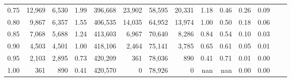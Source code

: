 \begin{tabular}{rrrrrrrrrrrrrr}
0.75 &  12,969 &  6,530 &    1.99 &  396,668 &   23,902 &  58,595 &  20,331 &  1.18 &  0.46 &  0.26 &      0.09 \\
0.80 &   9,867 &  6,357 &    1.55 &  406,535 &   14,035 &  64,952 &  13,974 &  1.00 &  0.50 &  0.18 &      0.06 \\
0.85 &   7,068 &  5,688 &    1.24 &  413,603 &    6,967 &  70,640 &   8,286 &  0.84 &  0.54 &  0.10 &      0.03 \\
0.90 &   4,503 &  4,501 &    1.00 &  418,106 &    2,464 &  75,141 &   3,785 &  0.65 &  0.61 &  0.05 &      0.01 \\
0.95 &   2,103 &  2,895 &    0.73 &  420,209 &      361 &  78,036 &     890 &  0.41 &  0.71 &  0.01 &      0.00 \\
1.00 &     361 &    890 &    0.41 &  420,570 &        0 &  78,926 &       0 &   nan &   nan &  0.00 &      0.00 \\
\bottomrule
\end{tabular}
